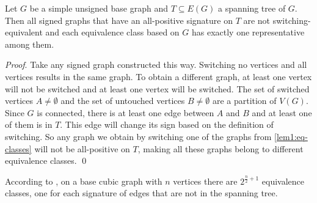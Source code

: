 \begin{lemma}\label{lem1:eq-classes}
    Let $G$ be a simple unsigned base graph and $T \subseteq E(G)$ a spanning tree of $G$. Then all signed graphs that have an all-positive signature on $T$ are not switching-equivalent and each equivalence class based on $G$ has exactly one representative among them.
\end{lemma}

\textit{Proof}. Take any signed graph constructed this way. Switching no vertices and all vertices results in the same graph. To obtain a different graph, at least one vertex will not be switched and at least one vertex will be switched. The set of switched vertices $A \neq \emptyset$ and the set of untouched vertices $B \neq \emptyset$ are a partition of $V(G)$. Since $G$ is connected, there is at least one edge between $A$ and $B$ and at least one of them is in $T$. This edge will change its sign based on the definition of switching. So any graph we obtain by switching one of the graphs from \cref{lem1:eq-classes} will not be all-positive on $T$, making all these graphs belong to different equivalence classes. \qed

According to , on a base cubic graph with $n$ vertices there are $2^{\frac{n}{2}+1}$ equivalence classes, one for each signature of edges that are not in the spanning tree.
